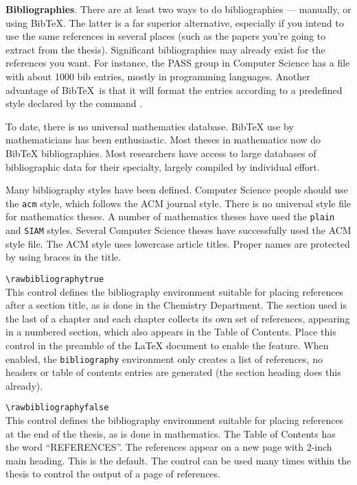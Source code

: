 {\bf Bibliographies}. There are at least two ways to do bibliographies
--- manually, or using Bib\TeX{}. The latter is a far superior
alternative, especially if you intend to use the same references in
several places (such as the papers you're going to extract from the
thesis). Significant bibliographies may already exist for the references
you want.  For instance, the PASS group in Computer Science has a file
with about 1000 bib entries, mostly in programming languages. Another
advantage of Bib\TeX\ is that it will format the entries according to a
predefined style declared by the command \verb||.

To date, there is no universal mathematics database. Bib\TeX{} use by
mathematicians has been enthusiastic. Most theses in mathematics now do
Bib\TeX{} bibliographies. Most researchers have access to large
databases of bibliographic data for their specialty, largely compiled by
individual effort.

Many bibliography styles have been defined.  Computer Science people
should use the \verb|acm| style, which follows the ACM journal style.
There is no universal style file for mathematics theses. A number of
mathematics theses have used the {\tt plain} and {\tt SIAM} styles.
Several Computer Science theses have successfully used the ACM style
file. The ACM style uses lowercase article titles. Proper names are
protected by using braces in the title.

\verb|\rawbibliographytrue| \\
This control defines the bibliography environment suitable for placing
references after a section title, as is done in the Chemistry
Department. The section used is the last of a chapter and each chapter
collects its own set of references, appearing in a numbered section,
which also appears in the Table of Contents. Place this control in the
preamble of the \LaTeX{} document to enable the feature. When enabled,
the {\tt bibliography} environment only creates a list of references, no
headers or table of contents entries are generated (the section heading
does this already).

\verb|\rawbibliographyfalse| \\
This control defines the bibliography environment suitable for placing
references at the end of the thesis, as is done in mathematics. The
Table of Contents has the word ``REFERENCES''. The references appear on
a new page with 2-inch main heading. This is the default. The control
can be used many times within the thesis to control the output of a page
of references.


